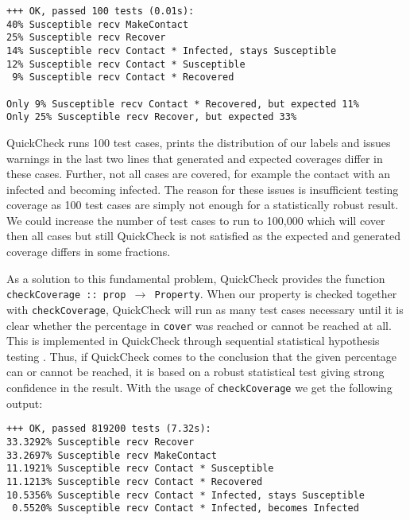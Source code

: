 \begin{footnotesize}
\begin{verbatim}
+++ OK, passed 100 tests (0.01s):
40% Susceptible recv MakeContact
25% Susceptible recv Recover
14% Susceptible recv Contact * Infected, stays Susceptible
12% Susceptible recv Contact * Susceptible
 9% Susceptible recv Contact * Recovered
    
Only 9% Susceptible recv Contact * Recovered, but expected 11%
Only 25% Susceptible recv Recover, but expected 33%
\end{verbatim}
\end{footnotesize}

QuickCheck runs 100 test cases, prints the distribution of our labels and issues warnings in the last two lines that generated and expected coverages differ in these cases. Further, not all cases are covered, for example the contact with an infected and becoming infected. The reason for these issues is insufficient testing coverage as 100 test cases are simply not enough for a statistically robust result. We could increase the number of test cases to run to 100,000 which will cover then all cases but still QuickCheck is not satisfied as the expected and generated coverage differs in some fractions. %

\medskip

As a solution to this fundamental problem, QuickCheck provides the function \texttt{checkCoverage :: prop $\rightarrow$ Property}. When our property is checked together with \texttt{checkCoverage}, QuickCheck will run as many test cases necessary until it is clear whether the percentage in \texttt{cover} was reached or cannot be reached at all. This is implemented in QuickCheck through sequential statistical hypothesis testing \cite{wald_sequential_1992}. Thus, if QuickCheck comes to the conclusion that the given percentage can or cannot be reached, it is based on a robust statistical test giving strong confidence in the result. With the usage of \texttt{checkCoverage} we get the following output:

\begin{footnotesize}
\begin{verbatim}
+++ OK, passed 819200 tests (7.32s):
33.3292% Susceptible recv Recover
33.2697% Susceptible recv MakeContact
11.1921% Susceptible recv Contact * Susceptible
11.1213% Susceptible recv Contact * Recovered
10.5356% Susceptible recv Contact * Infected, stays Susceptible
 0.5520% Susceptible recv Contact * Infected, becomes Infected
\end{verbatim}
\end{footnotesize}

